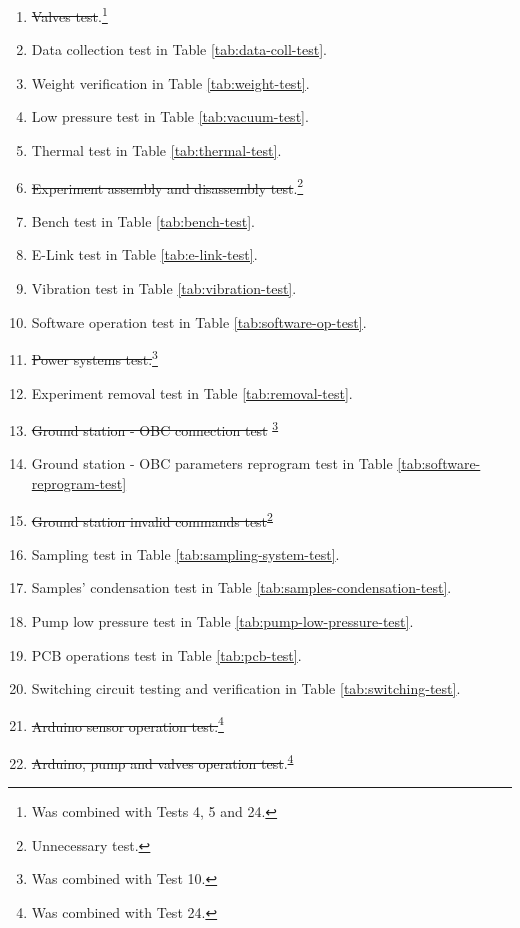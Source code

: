 \begin{enumerate}
    \item \st{Valves test}.\footnote{Was combined with Tests 4, 5 and 24.\label{fn:test-combined}}
    \item Data collection test in Table \ref{tab:data-coll-test}.
    \item Weight verification in Table \ref{tab:weight-test}.
    \item Low pressure test in Table \ref{tab:vacuum-test}.
    \item Thermal test in Table \ref{tab:thermal-test}.
    \item \st{Experiment assembly and disassembly test}.\footnote{Unnecessary test.\label{fn:test-removed}}
    \item Bench test in Table \ref{tab:bench-test}.
    \item E-Link test in Table \ref{tab:e-link-test}.
    \item Vibration test in Table \ref{tab:vibration-test}.
    \item Software operation test in Table \ref{tab:software-op-test}.
    \item \st{Power systems test.}\footnote{Was combined with Test 10.\label{fn:test-combined10}}
    \item Experiment removal test in Table \ref{tab:removal-test}.
    \item \st{Ground station - OBC connection test} \textsuperscript{\ref{fn:test-combined10}}
    \item Ground station - OBC parameters reprogram test in Table \ref{tab:software-reprogram-test}
    \item \st{Ground station invalid commands test}\textsuperscript{\ref{fn:test-removed}}
    \item Sampling test in Table \ref{tab:sampling-system-test}.
    \item Samples' condensation test in Table \ref{tab:samples-condensation-test}.
    \item Pump low pressure test in Table \ref{tab:pump-low-pressure-test}.
    \item PCB operations test in Table \ref{tab:pcb-test}.
    \item Switching circuit testing and verification in Table \ref{tab:switching-test}.
    \item \st{Arduino sensor operation test.}\footnote{Was combined with Test 24.\label{fn:test-combined24}}
    \item \st{Arduino, pump and valves operation test}.\textsuperscript{\ref{fn:test-combined24}}

\end{enumerate}
